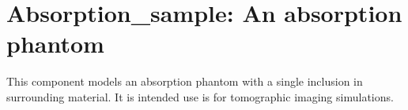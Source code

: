 \section{Absorption\_sample: An absorption phantom}
\label{absorption_sample}

This component models an absorption phantom with a single inclusion in surrounding material. It is intended use
is for tomographic imaging simulations.

 
